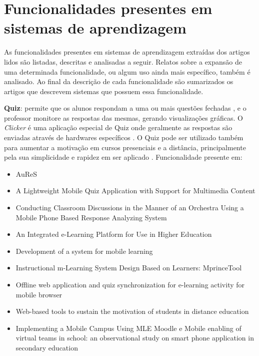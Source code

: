\section{Funcionalidades presentes em sistemas de aprendizagem}

As funcionalidades presentes em sistemas de aprendizagem extraídas dos artigos lidos são listadas, descritas e analisadas a seguir. Relatos sobre a expansão de uma determinada funcionalidade, ou algum uso ainda mais específico, também é analisado. Ao final da descrição de cada funcionalidade são sumarizados os artigos que descrevem sistemas que possuem essa funcionalidade.

\textbf{Quiz}: permite que os alunos respondam a uma ou mais questões fechadas \cite{tokiwa_web-based_2009, ijtihadie_offline_2010, schmiedl_mobile_2010, covic_development_2010, schon_lightweight_2012}, e o professor monitore as respostas das mesmas, gerando visualizações gráficas. O \emph{Clicker} é uma aplicação especial de Quiz onde geralmente as respostas são enviadas através de hardwares específicos \cite{tokiwa_web-based_2009}. O Quiz pode ser utilizado também para aumentar a motivação em cursos presenciais e a distância, principalmente pela sua simplicidade e rapidez em ser aplicado \cite{tokiwa_web-based_2009}. Funcionalidade presente em:

\vspace{-5mm}
\begin{itemize}
\item AuReS \cite{jagar_auress:_2012}
\item A Lightweight Mobile Quiz Application with Support for Multimedia Content \cite{schon_lightweight_2012}
\item Conducting Classroom Discussions in the Manner of an Orchestra Using a Mobile Phone Based Response Analyzing System \cite{nakai_conducting_2007}
\item An Integrated e-Learning Platform for Use in Higher Education \cite{florea_integrated_2011}
\item Development of a system for mobile learning \cite{covic_development_2010}
\item Instructional m-Learning System Design Based on Learners: MprinceTool \cite{fardoun_instructional_2010}
\item Offline web application and quiz synchronization for e-learning activity for mobile browser \cite{ijtihadie_offline_2010}
\item Web-based tools to sustain the motivation of students in distance education \cite{tokiwa_web-based_2009}
\item Implementing a Mobile Campus Using MLE Moodle \cite{xhafa_implementing_2010} e Mobile enabling of virtual teams in school: an observational study on smart phone application in secondary education \cite{schmiedl_mobile_2010}
\end{itemize}

